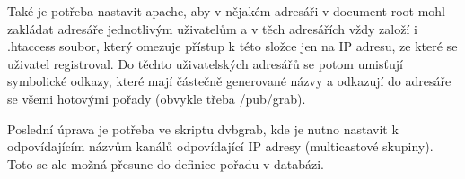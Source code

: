 \vspace{10pt}

Také je potřeba nastavit apache, aby v nějakém adresáři v document root mohl zakládat adresáře jednotlivým uživatelům a v těch adresářích vždy založí i .htaccess soubor, který omezuje přístup k této složce jen na IP adresu, ze které se uživatel registroval. Do těchto uživatelských adresářů se potom umisťují symbolické odkazy, které mají částečně generované názvy a odkazují do adresáře se všemi hotovými pořady (obvykle třeba /pub/grab).

\vspace{10pt}

Poslední úprava je potřeba ve skriptu dvbgrab, kde je nutno nastavit k odpovídajícím názvům kanálů odpovídající IP adresy (multicastové skupiny). Toto se ale možná přesune do definice pořadu v databázi.

\vspace{10pt}

